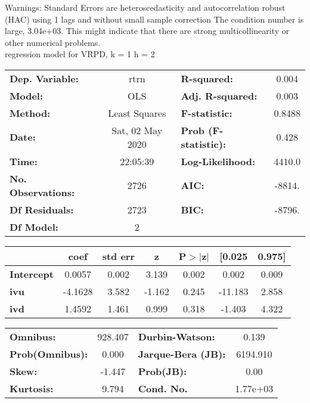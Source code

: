 Warnings: \newline
 [1] Standard Errors are heteroscedasticity and autocorrelation robust (HAC) using 1 lags and without small sample correction \newline
 [2] The condition number is large, 3.04e+03. This might indicate that there are \newline
 strong multicollinearity or other numerical problems.\\ 

regression model for VRPD, k = 1 h = 2\begin{center}
\begin{tabular}{lclc}
\toprule
\textbf{Dep. Variable:}    &       rtrn       & \textbf{  R-squared:         } &     0.004   \\
\textbf{Model:}            &       OLS        & \textbf{  Adj. R-squared:    } &     0.003   \\
\textbf{Method:}           &  Least Squares   & \textbf{  F-statistic:       } &    0.8488   \\
\textbf{Date:}             & Sat, 02 May 2020 & \textbf{  Prob (F-statistic):} &    0.428    \\
\textbf{Time:}             &     22:05:39     & \textbf{  Log-Likelihood:    } &    4410.0   \\
\textbf{No. Observations:} &        2726      & \textbf{  AIC:               } &    -8814.   \\
\textbf{Df Residuals:}     &        2723      & \textbf{  BIC:               } &    -8796.   \\
\textbf{Df Model:}         &           2      & \textbf{                     } &             \\
\bottomrule
\end{tabular}
\begin{tabular}{lcccccc}
                   & \textbf{coef} & \textbf{std err} & \textbf{z} & \textbf{P$> |$z$|$} & \textbf{[0.025} & \textbf{0.975]}  \\
\midrule
\textbf{Intercept} &       0.0057  &        0.002     &     3.139  &         0.002        &        0.002    &        0.009     \\
\textbf{ivu}       &      -4.1628  &        3.582     &    -1.162  &         0.245        &      -11.183    &        2.858     \\
\textbf{ivd}       &       1.4592  &        1.461     &     0.999  &         0.318        &       -1.403    &        4.322     \\
\bottomrule
\end{tabular}
\begin{tabular}{lclc}
\textbf{Omnibus:}       & 928.407 & \textbf{  Durbin-Watson:     } &    0.139  \\
\textbf{Prob(Omnibus):} &   0.000 & \textbf{  Jarque-Bera (JB):  } & 6194.910  \\
\textbf{Skew:}          &  -1.447 & \textbf{  Prob(JB):          } &     0.00  \\
\textbf{Kurtosis:}      &   9.794 & \textbf{  Cond. No.          } & 1.77e+03  \\
\bottomrule
\end{tabular}
\end{center}


